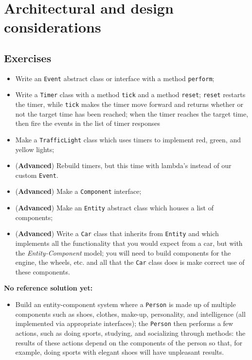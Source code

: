 \chapter{Architectural and design considerations}
    \section{Exercises}

        \begin{itemize}
            \item Write an \texttt{Event} abstract class or interface with a method \texttt{perform};
            \item Write a \texttt{Timer} class with a method \texttt{tick} and a method \texttt{reset}; \texttt{reset} restarts the timer, while \texttt{tick} makes the timer move forward and returns whether or not the target time has been reached; when the timer reaches the target time, then fire the events in the list of timer responses
            \item Make a \texttt{TrafficLight} class which uses timers to implement red, green, and yellow lights;
            \item (\textbf{Advanced}) Rebuild timers, but this time with lambda's instead of our custom \texttt{Event}.
            \item (\textbf{Advanced}) Make a \texttt{Component} interface;
            \item (\textbf{Advanced}) Make an \texttt{Entity} abstract class which houses a list of components;
            \item (\textbf{Advanced}) Write a \texttt{Car} class that inherits from \texttt{Entity} and which implements all the functionality that you would expect from a car, but with the \textit{Entity-Component} model; you will need to build components for the engine, the wheels, etc. and all that the \texttt{Car} class does is make correct use of these components.
        \end{itemize}

        \textbf{No reference solution yet:}
        \begin{itemize}
            \item Build an entity-component system where a \texttt{Person} is made up of multiple components such as shoes, clothes, make-up, personality, and intelligence (all implemented via appropriate interfaces); the \texttt{Person} then performs a few actions, such as doing sports, studying, and socializing through methods: the results of these actions depend on the components of the person so that, for example, doing sports with elegant shoes will have unpleasant results.
        \end{itemize}


